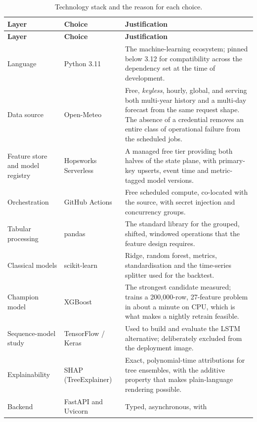 \begin{xltabular}{\textwidth}{P{2.6cm} P{3.1cm} Y}
\caption{Technology stack and the reason for each choice.}\label{tab:stack}\\
\toprule
\bfseries Layer & \bfseries Choice & \bfseries Justification \\
\midrule
\endfirsthead
\toprule
\bfseries Layer & \bfseries Choice & \bfseries Justification \\
\midrule
\endhead
\bottomrule
\endlastfoot
Language & Python 3.11 & The machine-learning ecosystem; pinned below 3.12 for
compatibility across the dependency set at the time of development. \\
Data source & Open-Meteo~\cite{ref:openmeteo} & Free, \emph{keyless}, hourly,
global, and serving both multi-year history and a multi-day forecast from the
same request shape. The absence of a credential removes an entire class of
operational failure from the scheduled jobs. \\
Feature store and model registry & Hopsworks Serverless~\cite{ref:hopsworks} & A
managed free tier providing both halves of the state plane, with primary-key
upserts, event time and metric-tagged model versions. \\
Orchestration & GitHub Actions~\cite{ref:ghactions} & Free scheduled compute,
co-located with the source, with secret injection and concurrency groups. \\
Tabular processing & pandas~\cite{ref:pandas} & The standard library for the
grouped, shifted, windowed operations that the feature design requires. \\
Classical models & scikit-learn~\cite{ref:sklearn} & Ridge, random forest,
metrics, standardisation and the time-series splitter used for the backtest. \\
Champion model & XGBoost~\cite{ref:xgboost} & The strongest candidate measured;
trains a 200,000-row, 27-feature problem in about a minute on CPU, which is what
makes a nightly retrain feasible. \\
Sequence-model study & TensorFlow / Keras~\cite{ref:tensorflow} & Used to build
and evaluate the LSTM alternative; deliberately excluded from the deployment
image. \\
Explainability & SHAP (TreeExplainer)~\cite{ref:treeshap} & Exact, polynomial-time
attributions for tree ensembles, with the additive property that makes
plain-language rendering possible. \\
Backend & FastAPI and Uvicorn~\cite{ref:fastapi} & Typed, asynchronous, with

\end{xltabular}
